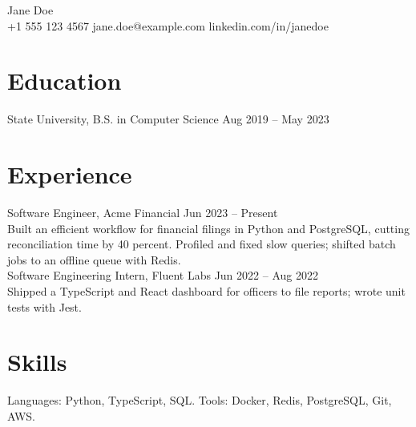 \documentclass[10pt]{article}
\begin{document}
\begin{center}{\Large Jane Doe}\\ +1 555 123 4567 \quad jane.doe@example.com \quad linkedin.com/in/janedoe\end{center}
\section*{Education}
State University, B.S. in Computer Science \hfill Aug 2019 -- May 2023
\section*{Experience}
Software Engineer, Acme Financial \hfill Jun 2023 -- Present\\
Built an efficient workflow for financial filings in Python and PostgreSQL, cutting reconciliation time by 40 percent.
Profiled and fixed slow queries; shifted batch jobs to an offline queue with Redis.\\
Software Engineering Intern, Fluent Labs \hfill Jun 2022 -- Aug 2022\\
Shipped a TypeScript and React dashboard for officers to file reports; wrote unit tests with Jest.
\section*{Skills}
Languages: Python, TypeScript, SQL. Tools: Docker, Redis, PostgreSQL, Git, AWS.
\end{document}

